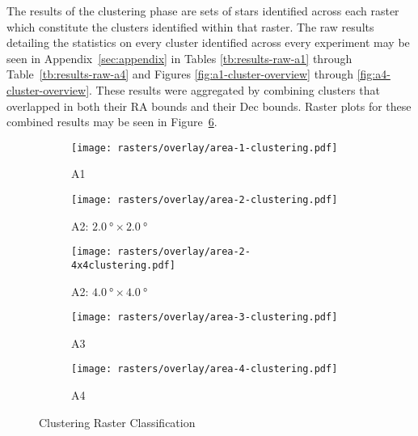 The results of the clustering phase are sets of stars identified across each raster which constitute the clusters identified within that raster. The raw results detailing the statistics on every cluster identified across every experiment may be seen in Appendix~\ref{sec:appendix} in Tables \ref{tb:results-raw-a1} through Table~\ref{tb:results-raw-a4} and Figures \ref{fig:a1-cluster-overview} through \ref{fig:a4-cluster-overview}. These results were aggregated by combining clusters that overlapped in both their RA bounds and their Dec bounds. Raster plots for these combined results may be seen in Figure~\ref{fig:filtered-clustering-rasters}.

\begin{figure}[H]
    \centering
    \begin{subfigure}[b]{0.75\textwidth}
        \texttt{[image: rasters/overlay/area-1-clustering.pdf]}
        \caption{\label{fig:clustering-a1-overview}A1}
    \end{subfigure}

    \begin{subfigure}[b]{0.49\textwidth}
        \texttt{[image: rasters/overlay/area-2-clustering.pdf]}
        \caption{\label{fig:clustering-a2-overview}A2: $\SI{2.0}{\degree}\times\SI{2.0}{\degree}$}
    \end{subfigure}
    \begin{subfigure}[b]{0.49\textwidth}
        \texttt{[image: rasters/overlay/area-2-4x4clustering.pdf]}
        \caption{\label{fig:clustering-a2-4x4-overview}A2: $\SI{4.0}{\degree}\times\SI{4.0}{\degree}$}
    \end{subfigure}

    \begin{subfigure}[b]{0.49\textwidth}
        \texttt{[image: rasters/overlay/area-3-clustering.pdf]}
        \caption{\label{fig:clustering-a3-overview}A3}
    \end{subfigure}
    \begin{subfigure}[b]{0.49\textwidth}
        \texttt{[image: rasters/overlay/area-4-clustering.pdf]}
        \caption{\label{fig:clustering-a4-overview}A4}
    \end{subfigure}
    \caption{\label{fig:filtered-clustering-rasters}Clustering Raster Classification}
\end{figure}

